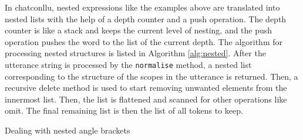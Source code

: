 In chatconllu, nested expressions like the examples above are translated into nested lists with the help of a depth counter and a push operation. The depth counter is like a stack and keeps the current level of nesting, and the push operation pushes the word to the list of the current depth. The algorithm for processing nested structures is listed in Algorithm \ref{alg:nested}. After the utterance string is processed by the \texttt{normalise} method, a nested list corresponding to the structure of the scopes in the utterance is returned. Then, a recursive delete method is used to start removing unwanted elements from the innermost list. Then, the list is flattened and scanned for other operations like omit. The final remaining list is then the list of all tokens to keep.
\clearpage
{}
\renewcommand{\CommentSty}[1]{\textnormal{\ttfamily\color{blue!50!black}#1}\unskip}
\LinesNotNumbered
\DontPrintSemicolon
\begin{algorithm}[H]\label{alg:nested}
\caption{Dealing with nested angle brackets}
  \;
\end{algorithm}

